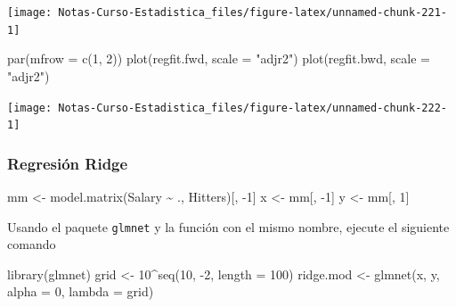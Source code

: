 \documentclass[
  12pt,
]{book}
\newenvironment{Shaded}{\begin{snugshade}}{\end{snugshade}}
\newcommand{\AttributeTok}[1]{\textcolor[rgb]{0.77,0.63,0.00}{#1}}
\newcommand{\DecValTok}[1]{\textcolor[rgb]{0.00,0.00,0.81}{#1}}
\newcommand{\FunctionTok}[1]{\textcolor[rgb]{0.00,0.00,0.00}{#1}}
\newcommand{\NormalTok}[1]{#1}
\newcommand{\OtherTok}[1]{\textcolor[rgb]{0.56,0.35,0.01}{#1}}
\newcommand{\SpecialCharTok}[1]{\textcolor[rgb]{0.00,0.00,0.00}{#1}}
\newcommand{\StringTok}[1]{\textcolor[rgb]{0.31,0.60,0.02}{#1}}
\theoremstyle{definition}
\theoremstyle{definition}
\theoremstyle{definition}
\theoremstyle{definition}
\theoremstyle{remark}
\begin{document}
\begin{center}\texttt{[image: Notas-Curso-Estadistica\_files/figure-latex/unnamed-chunk-221-1]} \end{center}

\begin{Shaded}
\begin{Highlighting}[]
\FunctionTok{par}\NormalTok{(}\AttributeTok{mfrow =} \FunctionTok{c}\NormalTok{(}\DecValTok{1}\NormalTok{, }\DecValTok{2}\NormalTok{))}
\FunctionTok{plot}\NormalTok{(regfit.fwd, }\AttributeTok{scale =} \StringTok{"adjr2"}\NormalTok{)}
\FunctionTok{plot}\NormalTok{(regfit.bwd, }\AttributeTok{scale =} \StringTok{"adjr2"}\NormalTok{)}
\end{Highlighting}
\end{Shaded}

\begin{center}\texttt{[image: Notas-Curso-Estadistica\_files/figure-latex/unnamed-chunk-222-1]} \end{center}

\hypertarget{regresiuxf3n-ridge-1}{%
\subsubsection{Regresión Ridge}\label{regresiuxf3n-ridge-1}}

\begin{Shaded}
\begin{Highlighting}[]
\NormalTok{mm }\OtherTok{\textless{}{-}} \FunctionTok{model.matrix}\NormalTok{(Salary }\SpecialCharTok{\textasciitilde{}}\NormalTok{ ., Hitters)[, }\SpecialCharTok{{-}}\DecValTok{1}\NormalTok{]}
\NormalTok{x }\OtherTok{\textless{}{-}}\NormalTok{ mm[, }\SpecialCharTok{{-}}\DecValTok{1}\NormalTok{]}
\NormalTok{y }\OtherTok{\textless{}{-}}\NormalTok{ mm[, }\DecValTok{1}\NormalTok{]}
\end{Highlighting}
\end{Shaded}

Usando el paquete \texttt{glmnet} y la función con el mismo nombre, ejecute el siguiente comando

\begin{Shaded}
\begin{Highlighting}[]
\FunctionTok{library}\NormalTok{(glmnet)}
\NormalTok{grid }\OtherTok{\textless{}{-}} \DecValTok{10}\SpecialCharTok{\^{}}\FunctionTok{seq}\NormalTok{(}\DecValTok{10}\NormalTok{, }\SpecialCharTok{{-}}\DecValTok{2}\NormalTok{, }\AttributeTok{length =} \DecValTok{100}\NormalTok{)}
\NormalTok{ridge.mod }\OtherTok{\textless{}{-}} \FunctionTok{glmnet}\NormalTok{(x, y, }\AttributeTok{alpha =} \DecValTok{0}\NormalTok{, }\AttributeTok{lambda =}\NormalTok{ grid)}
\end{Highlighting}
\end{Shaded}
\end{document}
